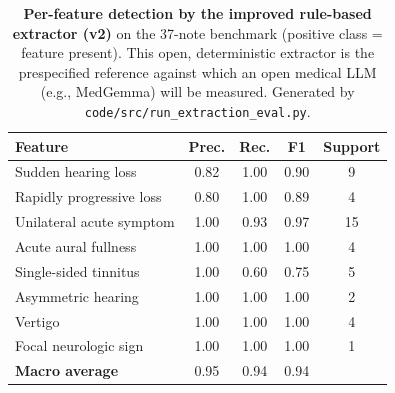 \begin{table}[htbp]
\centering
\caption{\textbf{Per-feature detection by the improved rule-based extractor (v2)} on the 37-note benchmark (positive class = feature present). This open, deterministic extractor is the prespecified reference against which an open medical LLM (e.g., MedGemma) will be measured. Generated by \texttt{code/src/run\_extraction\_eval.py}.}
\label{tab:extraction}
\small
\begin{tabular}{lcccc}
\toprule
Feature & Prec. & Rec. & F1 & Support \\
\midrule
Sudden hearing loss & 0.82 & 1.00 & 0.90 & 9 \\
Rapidly progressive loss & 0.80 & 1.00 & 0.89 & 4 \\
Unilateral acute symptom & 1.00 & 0.93 & 0.97 & 15 \\
Acute aural fullness & 1.00 & 1.00 & 1.00 & 4 \\
Single-sided tinnitus & 1.00 & 0.60 & 0.75 & 5 \\
Asymmetric hearing & 1.00 & 1.00 & 1.00 & 2 \\
Vertigo & 1.00 & 1.00 & 1.00 & 4 \\
Focal neurologic sign & 1.00 & 1.00 & 1.00 & 1 \\
\midrule
\textbf{Macro average} & 0.95 & 0.94 & 0.94 & \\
\bottomrule
\end{tabular}
\end{table}
